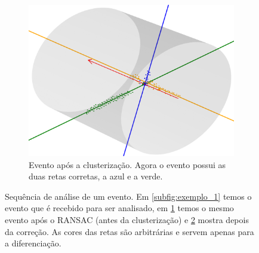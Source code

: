 \documentclass[a4paper,12pt,oneside]{book}
\begin{document}
\begin{figure}[H]
\begin{subfigure}[t]{0.45\textwidth}
        \label{subfig:antes_clustering}
    \end{subfigure}%
    \hspace{0.5cm}
    \begin{subfigure}[t]{0.45\textwidth}
        \centering
        \includegraphics[scale=0.25, width=.95\columnwidth]{figs/fig_cluster.png}
        \caption{Evento após a clusterização. Agora o evento possui as duas retas corretas, a azul e a verde.}
        \label{subfig:depois_clustering}
    \end{subfigure}
\caption{Sequência de análise de um evento. Em \ref{subfig:exemplo_1} temos o evento que é recebido para ser analisado, em \ref{subfig:antes_clustering} temos o mesmo evento após o RANSAC (antes da clusterização) e \ref{subfig:depois_clustering} mostra depois da correção. As cores das retas são arbitrárias e servem apenas para a diferenciação.}
\label{fig:3d_examples}
\end{figure}


\end{document}
